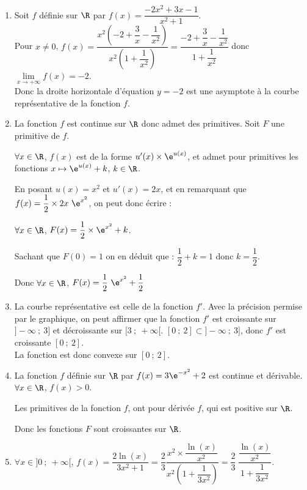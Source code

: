 \medskip

\begin{enumerate}
	\item Soit $f$ définie sur $\R$ par $f(x)=\dfrac{-2x^2+3x-1}{x^2+1}$.\\
	Pour $x\neq 0$, $f(x)=\dfrac{x^2\left(-2+\dfrac{3}{x}-\dfrac{1}{x^2}\right)}{x^2\left(1+\dfrac{1}{x^2}\right)}=\dfrac{-2+\dfrac{3}{x}-\dfrac{1}{x^2}}{1+\dfrac{1}{x^2}}$ donc $\displaystyle\lim\limits_{x \rightarrow +\infty} f(x)=-2$.\\ Donc la droite horizontale d'équation $y=-2$ est une asymptote à la courbe représentative de la fonction $f$. \hfill {}
	
	\item La fonction $f$ est continue sur $\R$ donc admet des primitives. Soit $F$ une primitive de $f$.
	
$\forall x \in \R$, $f(x)$ est de la forme $u'(x)\times \e^{u(x)}$, et admet pour primitives les fonctions $x\mapsto\e^{u(x)}+k$, $k\in\R$.

En posant $u(x) = x^2$ et $u'(x)=2x$, et en remarquant que $f(x)=\dfrac{1}{2}\times 2x~\e^{x^2}$, on peut donc écrire :

$\forall x \in \R$, $F(x)=\dfrac{1}{2}\times \e^{x^2}+k$.
	
	Sachant que $F(0)=1$ on en déduit que : $\dfrac{1}{2}+k=1$ donc $k=\dfrac{1}{2}$.

	Donc $\forall x \in \R$, $F(x)=\dfrac{1}{2}~\e^{x^2}+\dfrac{1}{2}$  \hfill {}
	\item La courbe représentative est celle de la fonction $f'$. Avec la précision permise par le graphique, on peut affirmer que la fonction $f'$ est croissante sur $]-\infty~;~3]$ et décroissante sur $[3~;~+\infty[$. $[0~;~2] \subset ]-\infty~;~3]$, donc $f'$ est croissante $[0~;~2]$.\\
La fonction est donc convexe sur $[0~;~2]$. \hfill {}
	\item La fonction $f$ définie sur $\R$ par $f(x)=3\e^{-x^2}+2$ est continue et dérivable. $\forall x \in \R$, $f(x)>0$.
	
Les primitives de la fonction $f$, ont pour dérivée $f$, qui est positive sur $\R$.

Donc les fonctions $F$ sont croissantes sur $\R$. \hfill {}
	\item $\forall x \in ]0~;~+ \infty[$, $f(x)=\dfrac{2\ln(x)}{3x^2+1}= \dfrac23\dfrac{x^2\times \dfrac{\ln(x)}{x^2}}{x^2\left(1+\dfrac{1}{3x^2}\right)}= \dfrac23~\dfrac{\dfrac{\ln(x)}{x^2}}{1+\dfrac{1}{3x^2}}$.


\end{enumerate}
